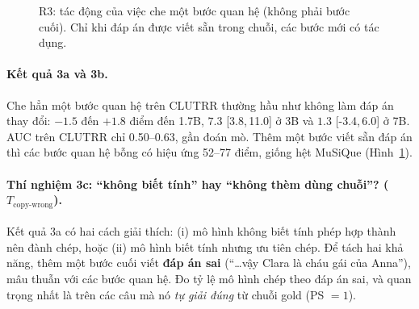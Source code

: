 \documentclass[11pt]{article}
\newcommand{\dn}{\mathrm{do}_{\text{naive}}}
\newcommand{\dt}{\mathrm{do}_{\text{total}}}
\newcommand{\ci}[2]{{\scriptsize[#1,\,#2]}}
\begin{document}
\begin{figure}[h]
\centering
{}
\caption{R3: tác động của việc che một bước quan hệ (không phải bước cuối). Chỉ khi đáp án được
viết sẵn trong chuỗi, các bước mới có tác dụng.}
\label{fig:r3}
\end{figure}

\paragraph{Kết quả 3a và 3b.} Che hẳn một bước quan hệ trên CLUTRR thường hầu như không làm đáp án
thay đổi: $-1.5$ đến $+1.8$ điểm đến 1.7B, $7.3$ \ci{3.8}{11.0} ở 3B và $1.3$ \ci{-3.4}{6.0} ở 7B.
AUC trên CLUTRR chỉ 0.50--0.63, gần đoán mò. Thêm một bước viết sẵn đáp án thì các bước quan hệ
bỗng có hiệu ứng 52--77 điểm, giống hệt MuSiQue (Hình~\ref{fig:r3}).

\paragraph{Thí nghiệm 3c: ``không biết tính'' hay ``không thèm dùng chuỗi''?
($T_{\text{copy-wrong}}$).} Kết quả 3a có hai cách giải thích: (i) mô hình không biết tính phép hợp
thành nên đành chép, hoặc (ii) mô hình biết tính nhưng ưu tiên chép. Để tách hai khả năng, thêm một
bước cuối viết \textbf{đáp án sai} (``\dots vậy Clara là cháu gái của Anna''), mâu thuẫn với các
bước quan hệ. Đo tỷ lệ mô hình chép theo đáp án sai, và quan trọng nhất là trên các câu mà nó
\emph{tự giải đúng} từ chuỗi gold (PS $=1$).
\end{document}

